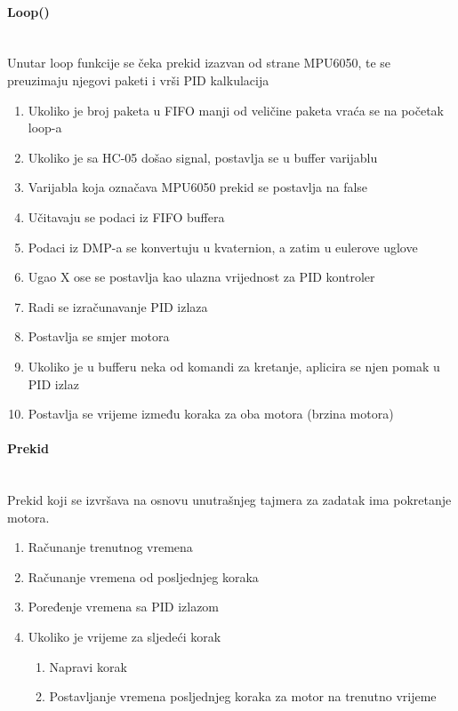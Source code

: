 \documentclass[../Document.tex]{subfiles}
\begin{document}
\paragraph{Loop()}\mbox{}\\
\noindent Unutar loop funkcije se čeka prekid izazvan od strane MPU6050, te se preuzimaju njegovi paketi i vrši PID kalkulacija

\begin{enumerate}
    \item Ukoliko je broj paketa u FIFO manji od veličine paketa vraća se na početak loop-a
    \item Ukoliko je sa HC-05 došao signal, postavlja se u buffer varijablu
    \item Varijabla koja označava MPU6050 prekid se postavlja na false
    \item Učitavaju se podaci iz FIFO buffera
    \item Podaci iz DMP-a se konvertuju u kvaternion, a zatim u eulerove uglove
    \item Ugao X ose se postavlja kao ulazna vrijednost za PID kontroler
    \item Radi se izračunavanje PID izlaza
    \item Postavlja se smjer motora
    \item Ukoliko je u bufferu neka od komandi za kretanje, aplicira se njen pomak u PID izlaz
    \item Postavlja se vrijeme između koraka za oba motora (brzina motora)
\end{enumerate}

\paragraph{Prekid}\mbox{}\\
\noindent Prekid koji se izvršava na osnovu unutrašnjeg tajmera za zadatak ima pokretanje motora.

\begin{enumerate}
    \item Računanje trenutnog vremena
    \item Računanje vremena od posljednjeg koraka
    \item Poređenje vremena sa PID izlazom
    \item Ukoliko je vrijeme za sljedeći korak
          \begin{enumerate}
              \item Napravi korak
              \item Postavljanje vremena posljednjeg koraka za motor na trenutno vrijeme
          \end{enumerate}
\end{enumerate}
\end{document}
